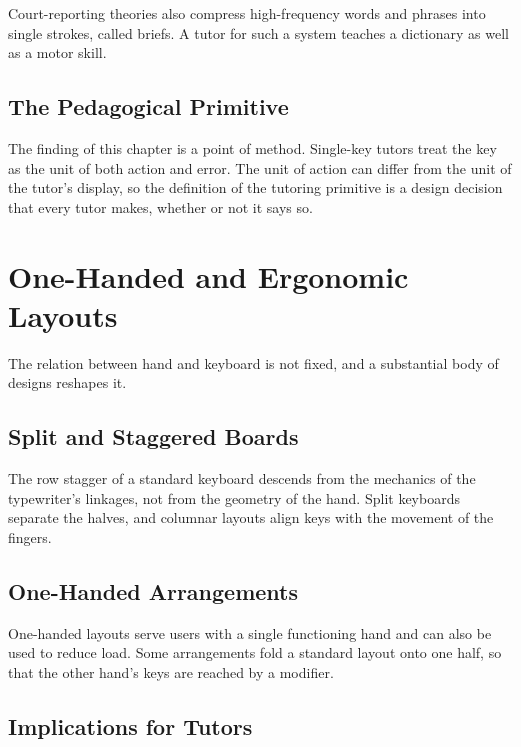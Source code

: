 Court-reporting theories also compress high-frequency words and phrases into single strokes, called briefs. A tutor for such a system teaches a dictionary as well as a motor skill. 

\section{The Pedagogical Primitive}

The finding of this chapter is a point of method. Single-key tutors treat the key as the unit of both action and error. The unit of action can differ from the unit of the tutor's display, so the definition of the tutoring primitive is a design decision that every tutor makes, whether or not it says so.

\chapter{One-Handed and Ergonomic Layouts}

The relation between hand and keyboard is not fixed, and a substantial body of designs reshapes it.

\section{Split and Staggered Boards}

The row stagger of a standard keyboard descends from the mechanics of the typewriter's linkages, not from the geometry of the hand. Split keyboards separate the halves, and columnar layouts align keys with the movement of the fingers. 

\section{One-Handed Arrangements}

One-handed layouts serve users with a single functioning hand and can also be used to reduce load. Some arrangements fold a standard layout onto one half, so that the other hand's keys are reached by a modifier. 

\section{Implications for Tutors}

